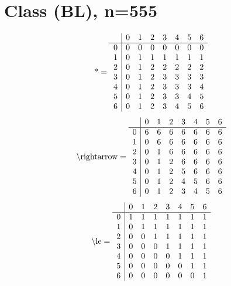 \documentclass[11pt]{article}
\begin{document}
\section{Class (BL), n=555}
\[\text{*} = 
\begin{array}{r | r r r r r r r}
 & 0 & 1 & 2 & 3 & 4 & 5 & 6 \\ \hline
0 & 0 & 0 & 0 & 0 & 0 & 0 & 0 \\
1 & 0 & 1 & 1 & 1 & 1 & 1 & 1 \\
2 & 0 & 1 & 2 & 2 & 2 & 2 & 2 \\
3 & 0 & 1 & 2 & 3 & 3 & 3 & 3 \\
4 & 0 & 1 & 2 & 3 & 3 & 3 & 4 \\
5 & 0 & 1 & 2 & 3 & 3 & 4 & 5 \\
6 & 0 & 1 & 2 & 3 & 4 & 5 & 6 \\
\end{array}
\]
\[\text{\textbackslash rightarrow} = 
\begin{array}{r | r r r r r r r}
 & 0 & 1 & 2 & 3 & 4 & 5 & 6 \\ \hline
0 & 6 & 6 & 6 & 6 & 6 & 6 & 6 \\
1 & 0 & 6 & 6 & 6 & 6 & 6 & 6 \\
2 & 0 & 1 & 6 & 6 & 6 & 6 & 6 \\
3 & 0 & 1 & 2 & 6 & 6 & 6 & 6 \\
4 & 0 & 1 & 2 & 5 & 6 & 6 & 6 \\
5 & 0 & 1 & 2 & 4 & 5 & 6 & 6 \\
6 & 0 & 1 & 2 & 3 & 4 & 5 & 6 \\
\end{array}
\]
\[\text{\textbackslash le} = 
\begin{array}{r | r r r r r r r}
 & 0 & 1 & 2 & 3 & 4 & 5 & 6 \\ \hline
0 & 1 & 1 & 1 & 1 & 1 & 1 & 1 \\
1 & 0 & 1 & 1 & 1 & 1 & 1 & 1 \\
2 & 0 & 0 & 1 & 1 & 1 & 1 & 1 \\
3 & 0 & 0 & 0 & 1 & 1 & 1 & 1 \\
4 & 0 & 0 & 0 & 0 & 1 & 1 & 1 \\
5 & 0 & 0 & 0 & 0 & 0 & 1 & 1 \\
6 & 0 & 0 & 0 & 0 & 0 & 0 & 1 \\
\end{array}
\]
\end{document}
